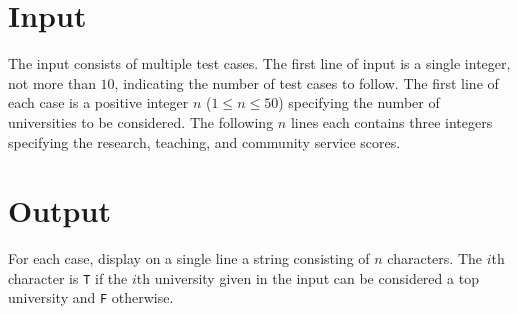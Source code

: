 \section*{Input}

The input consists of multiple test cases. The first line of input 
is a single integer, not more than $10$, indicating the number
of test cases to follow.  
The first line of each case is a positive integer
$n$ ($1 \leq n \leq 50$) specifying the number of universities to be
considered.  The following $n$ lines each contains three integers
specifying the research, teaching, and community service scores.  


\section*{Output}

For each case, display on a single line a string consisting of $n$
characters.  The $i$th character is \verb|T| if the $i$th university
given in the input can be considered a top university and \verb|F|
otherwise.
